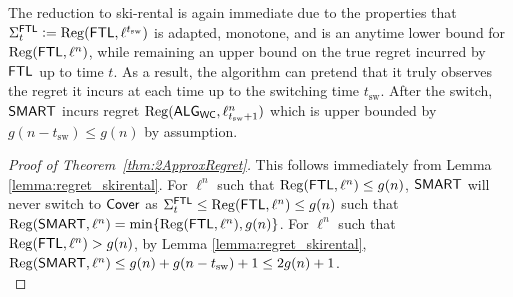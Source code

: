 The reduction to ski-rental is again immediate due to the properties that $\Sigma^{\mathsf{FTL}}_t := \mathrm{Reg}(\mathsf{FTL},\ell^{t_{\mathrm{sw}}})$ is adapted, monotone, and is an anytime lower bound for $\mathrm{Reg}(\mathsf{FTL},\ell^n)$, while remaining an upper bound on the true regret incurred by $\mathsf{FTL}$ up to time $t$. As a result, the algorithm can pretend that it truly observes the regret it incurs at each time up to the switching time $t_{\mathrm{sw}}$. After the switch, $\mathsf{SMART}$ incurs regret $\mathrm{Reg}(\mathsf{ALG}_{\mathsf{WC}}, \ell_{t_{\mathrm{sw}}+1}^n)$ which is upper bounded by $g(n-t_{\mathrm{sw}}) \leq g(n)$ by assumption.\\


\begin{proof}[Proof of Theorem~\ref{thm:2ApproxRegret}]
This follows immediately from Lemma \ref{lemma:regret_skirental}. For $\ell^n$ such that $\mathrm{Reg}(\mathsf{FTL},\ell^n) \le g(n)$, $\mathsf{SMART}$ will never switch to $\mathsf{Cover}$ as $\Sigma^{\mathsf{FTL}}_t \le \mathrm{Reg}(\mathsf{FTL}, \ell^n) \leq g(n)$ such that $\mathrm{Reg}(\mathsf{SMART},\ell^n) = \min\{\mathrm{Reg}(\mathsf{FTL}, \ell^n), g(n)\}$. For $\ell^n$ such that $\mathrm{Reg}(\mathsf{FTL},\ell^n) > g(n)$, by Lemma \ref{lemma:regret_skirental}, $\mathrm{Reg}(\mathsf{SMART}, \ell^n)\leq g(n) + g(n-t_{\mathrm{sw}}) +1 \leq 2 g(n) +1$. \\%
\end{proof}

% 

